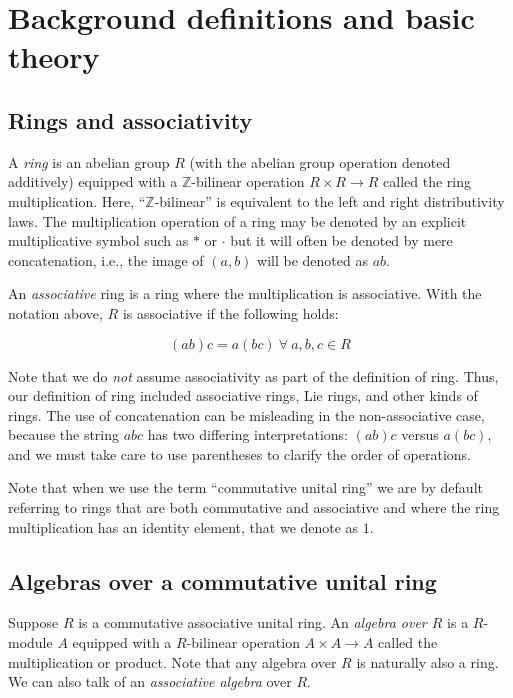 \documentclass{ucetd}
\begin{document}
\appendix

\section{Background definitions and basic theory}

\subsection{Rings and associativity}

A {\em ring} is an abelian group $R$ (with the abelian group operation
denoted additively) equipped with a $\mathbb{Z}$-bilinear operation $R
\times R \to R$ called the ring multiplication. Here,
``$\mathbb{Z}$-bilinear'' is equivalent to the left and right
distributivity laws. The multiplication operation of a ring may be
denoted by an explicit multiplicative symbol such as $*$ or $\cdot$
but it will often be denoted by mere concatenation, i.e., the image of
$(a,b)$ will be denoted as $ab$.

An {\em associative} ring is a ring where the multiplication is
associative. With the notation above, $R$ is associative if the
following holds:

$$(ab)c = a(bc) \ \forall \ a,b,c \in R$$

Note that we do {\em not} assume associativity as part of the
definition of ring. Thus, our definition of ring included associative
rings, Lie rings, and other kinds of rings. The use of concatenation
can be misleading in the non-associative case, because the string
$abc$ has two differing interpretations: $(ab)c$ versus $a(bc)$, and
we must take care to use parentheses to clarify the order of operations.

Note that when we use the term ``commutative unital ring'' we are by
default referring to rings that are both commutative and associative
and where the ring multiplication has an identity element, that we
denote as $1$.

\subsection{Algebras over a commutative unital ring}

Suppose $R$ is a commutative associative unital ring. An {\em algebra
  over $R$} is a $R$-module $A$ equipped with a $R$-bilinear operation
$A \times A \to A$ called the multiplication or product. Note that any
algebra over $R$ is naturally also a ring. We can also talk of an {\em
  associative algebra} over $R$.
\end{document}
